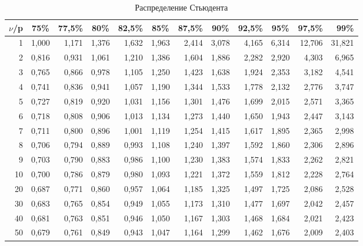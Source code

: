 \documentclass[12pt,a4paper]{article}
\begin{document}
\begin{table}[htbp]
  \fontsize{10pt}{10pt}\selectfont
  \centering
  \caption{Распределение Стьюдента}
    \begin{tabular}{rrrrrrrrrrrr}
    \toprule
    $\nu$/p  & \multicolumn{1}{c}{75\%} & \multicolumn{1}{c}{77,5\%} & \multicolumn{1}{c}{80\%} & \multicolumn{1}{c}{82,5\%} & \multicolumn{1}{c}{85\%} & \multicolumn{1}{c}{87,5\%} & \multicolumn{1}{c}{90\%} & \multicolumn{1}{c}{92,5\%} & \multicolumn{1}{c}{95\%} & \multicolumn{1}{c}{97,5\%} & 99\% \\
    \midrule
    1     & 1,000 & 1,171 & 1,376 & 1,632 & 1,963 & 2,414 & 3,078 & 4,165 & 6,314 & 12,706 & 31,821 \\
    2     & 0,816 & 0,931 & 1,061 & 1,210 & 1,386 & 1,604 & 1,886 & 2,282 & 2,920 & 4,303 & 6,965 \\
    3     & 0,765 & 0,866 & 0,978 & 1,105 & 1,250 & 1,423 & 1,638 & 1,924 & 2,353 & 3,182 & 4,541 \\
    4     & 0,741 & 0,836 & 0,941 & 1,057 & 1,190 & 1,344 & 1,533 & 1,778 & 2,132 & 2,776 & 3,747 \\
    5     & 0,727 & 0,819 & 0,920 & 1,031 & 1,156 & 1,301 & 1,476 & 1,699 & 2,015 & 2,571 & 3,365 \\
    6     & 0,718 & 0,808 & 0,906 & 1,013 & 1,134 & 1,273 & 1,440 & 1,650 & 1,943 & 2,447 & 3,143 \\
    7     & 0,711 & 0,800 & 0,896 & 1,001 & 1,119 & 1,254 & 1,415 & 1,617 & 1,895 & 2,365 & 2,998 \\
    8     & 0,706 & 0,794 & 0,889 & 0,993 & 1,108 & 1,240 & 1,397 & 1,592 & 1,860 & 2,306 & 2,896 \\
    9     & 0,703 & 0,790 & 0,883 & 0,986 & 1,100 & 1,230 & 1,383 & 1,574 & 1,833 & 2,262 & 2,821 \\
    10    & 0,700 & 0,786 & 0,879 & 0,980 & 1,093 & 1,221 & 1,372 & 1,559 & 1,812 & 2,228 & 2,764 \\
    20    & 0,687 & 0,771 & 0,860 & 0,957 & 1,064 & 1,185 & 1,325 & 1,497 & 1,725 & 2,086 & 2,528 \\
    30    & 0,683 & 0,765 & 0,854 & 0,949 & 1,055 & 1,173 & 1,310 & 1,477 & 1,697 & 2,042 & 2,457 \\
    40    & 0,681 & 0,763 & 0,851 & 0,946 & 1,050 & 1,167 & 1,303 & 1,468 & 1,684 & 2,021 & 2,423 \\
    50    & 0,679 & 0,761 & 0,849 & 0,943 & 1,047 & 1,164 & 1,299 & 1,462 & 1,676 & 2,009 & 2,403 \\

\end{tabular}
\end{table}
\end{document}
